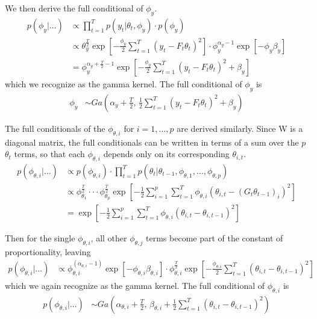 \documentclass{article}
\begin{document}
We then derive the full conditional of $\phi_y$.
\begin{align*}
	p\left(\phi_y | \hdots \right) &\propto
	\prod_{t=1}^{T} p\left(y_t | \theta_t, \phi_y \right) \cdot p\left(\phi_y \right) \\
	&\propto \theta_y^{\frac{T}{2}} 
		\exp\left[-\frac{\phi_y}{2}\sum_{t=1}^{T} \left(y_t - F_t\theta_t \right)^2 \right]
	\cdot
	\phi_y^{\alpha_y-1}
	\exp\left[-\phi_y \beta_y \right] \\
	&= \phi_y^{\alpha_y + \frac{T}{2}-1}
	\exp\left[-\frac{\phi_y}{2}\sum_{t=1}^{T} \left(y_t - F_t\theta_t \right)^2 + \beta_y \right]
\end{align*}
which we recognize as the gamma kernel.  The full conditional of $\phi_y$ is
\begin{align*}
	\phi_y &\sim Ga\left( 
		\alpha_y + \frac{T}{2} \text{, }
		\frac{1}{2}\sum_{t=1}^{T} \left(y_t - F_t\theta_t \right)^2 + \beta_y
	\right)
\end{align*}

The full conditionals of the $\phi_{\theta,i}$ for $i = 1,\hdots,p$ are derived similarly.  Since W is a diagonal matrix, the full conditionals can be written in terms of a sum over the $p$ $\theta_t$ terms, so that each $\phi_{\theta,i}$ depends only on its corresponding $\theta_{i,t}$.
\begin{align*}
	p\left(\phi_{\theta,i} | \hdots \right) &\propto
	p\left(\phi_{\theta,i} \right)
	\cdot
	\prod_{t=1}^{T} p\left(\theta_t | \theta_{t-1}, \phi_{\theta,1},\hdots,\phi_{\theta,p} \right)\\
	&\propto \phi_{\theta_1}^{\frac{T}{2}} \cdot \cdot \cdot \phi_{\theta_p}^{\frac{T}{2}}
	\exp\left[-\frac{1}{2} \sum_{i=1}^{p} \sum_{t=1}^{T} \phi_{\theta,i} \left(\theta_{i,t} - 
		\left(G_t \theta_{t-1} \right)_i \right)^2
	\right]\\
	&= 	\exp\left[-\frac{1}{2} \sum_{i=1}^{p} \sum_{t=1}^{T} \phi_{\theta,i} \left(\theta_{i,t} - 
		\theta_{i,t-1} \right)^2
	\right]
\end{align*}

Then for the single $\phi_{\theta,i}$, all other $\phi_{\theta,j}$ terms become part of the constant of proportionality, leaving
\begin{align*}
	p\left(\phi_{\theta,i} | \hdots \right) &\propto
	\phi_{\theta,i}^{\left(\alpha_{\theta,i}-1 \right)}
	\exp\left[-\phi_{\theta,i}\beta_ {\theta,i}\right]
	\cdot
	\phi_{\theta,i}^{\frac{T}{2}}
	\exp\left[-\frac{\phi_{\theta,i}}{2} \sum_{t=1}^{T}
		\left(\theta_{i,t} - \theta_{i,t-1} \right)^2
	 \right]
\end{align*}
which we again recognize as the gamma kernel.  The full conditional of $\phi_{\theta,i}$ is
\begin{align*}
	p\left(\phi_{\theta,i} | \hdots \right) &\sim
	Ga\left(
		\alpha_{\theta,i} + \frac{T}{2} \text{, } 
		\beta_{\theta,i} + \frac{1}{2}\sum_{t=1}^{T}
		\left(\theta_{i,t} - \theta_{i,t-1} \right)^2
	\right)
\end{align*}
\end{document}
